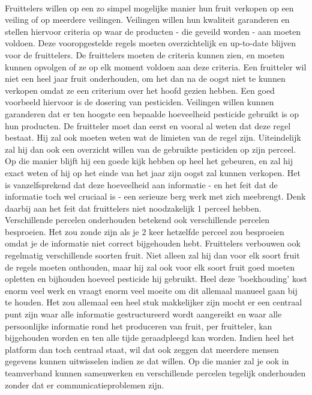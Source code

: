 \paragraph {} Fruittelers willen op een zo simpel mogelijke manier hun fruit
verkopen op een veiling of op meerdere veilingen. Veilingen willen hun kwaliteit
garanderen en stellen hiervoor criteria op waar de producten - die geveild worden - aan
moeten voldoen. Deze vooropgestelde regels moeten overzichtelijk en up-to-date blijven
voor de fruittelers. De fruittelers moeten de criteria kunnen zien, en moeten kunnen
opvolgen of ze op elk moment voldoen aan deze criteria. Een fruitteler wil niet een heel
jaar fruit onderhouden, om het dan na de oogst niet te kunnen verkopen omdat ze een
criterium over het hoofd gezien hebben. Een goed voorbeeld hiervoor is de dosering van
pesticiden. Veilingen willen kunnen garanderen dat er ten hoogste een bepaalde hoeveelheid
pesticide gebruikt is op hun producten. De fruitteler moet dan eerst en vooral al weten
dat deze regel bestaat. Hij zal ook moeten weten wat de limieten van de regel zijn.
Uiteindelijk zal hij dan ook een overzicht willen van de gebruikte pesticiden op zijn
perceel. Op die manier blijft hij een goede kijk hebben op heel het gebeuren, en zal hij
exact weten of hij op het einde van het jaar zijn oogst zal kunnen verkopen. Het is
vanzelfsprekend dat deze hoeveelheid aan informatie - en het feit dat de informatie toch
wel cruciaal is - een serieuze berg werk met zich meebrengt. Denk daarbij aan het feit dat
fruittelers niet noodzakelijk 1 perceel hebben. Verschillende percelen onderhouden
betekend ook verschillende percelen besproeien. Het zou zonde zijn als je 2 keer hetzelfde
perceel zou besproeien omdat je de informatie niet correct bijgehouden hebt. Fruittelers
verbouwen ook regelmatig verschillende soorten fruit. Niet alleen zal hij dan voor elk
soort fruit de regels moeten onthouden, maar hij zal ook voor elk soort fruit goed moeten
opletten en bijhouden hoeveel pesticide hij gebruikt. Heel deze 'boekhouding' kost enorm
veel werk en vraagt enorm veel moeite om dit allemaal manueel gaan bij te houden. Het zou
allemaal een heel stuk makkelijker zijn mocht er een centraal punt zijn waar alle
informatie gestructureerd wordt aangereikt en waar alle persoonlijke informatie rond het
produceren van fruit, per fruitteler, kan bijgehouden worden en ten alle tijde
geraadpleegd kan worden. Indien heel het platform dan toch centraal staat, wil dat ook
zeggen dat meerdere mensen gegevens kunnen uitwisselen indien ze dat willen. Op die manier
zal je ook in teamverband kunnen samenwerken en verschillende percelen tegelijk
onderhouden zonder dat er communicatieproblemen zijn.

